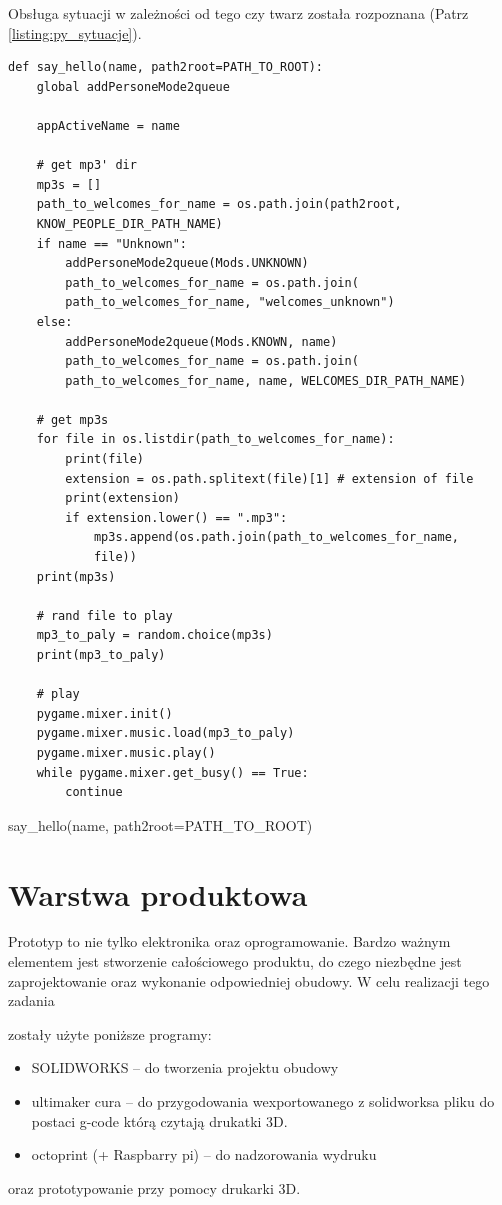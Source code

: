 \documentclass[a4paper,12pt,reqno]{article}
\begin{document}
\newpage
Obsługa sytuacji w zależności od tego czy twarz została rozpoznana  (Patrz \ref{listing:py_sytuacje}).
\begin{listing}[H]%
\begin{mdframed}[backgroundcolor=codebg]
\begin{verbatim}
def say_hello(name, path2root=PATH_TO_ROOT):
    global addPersoneMode2queue
    
    appActiveName = name
    
    # get mp3' dir
    mp3s = []
    path_to_welcomes_for_name = os.path.join(path2root, 
    KNOW_PEOPLE_DIR_PATH_NAME)
    if name == "Unknown":
        addPersoneMode2queue(Mods.UNKNOWN)
        path_to_welcomes_for_name = os.path.join(
        path_to_welcomes_for_name, "welcomes_unknown")
    else:
        addPersoneMode2queue(Mods.KNOWN, name)
        path_to_welcomes_for_name = os.path.join(
        path_to_welcomes_for_name, name, WELCOMES_DIR_PATH_NAME)
        
    # get mp3s
    for file in os.listdir(path_to_welcomes_for_name):
        print(file)
        extension = os.path.splitext(file)[1] # extension of file
        print(extension)
        if extension.lower() == ".mp3":
            mp3s.append(os.path.join(path_to_welcomes_for_name, 
            file))
    print(mp3s)        
        
    # rand file to play
    mp3_to_paly = random.choice(mp3s)
    print(mp3_to_paly)
    
    # play      
    pygame.mixer.init()
    pygame.mixer.music.load(mp3_to_paly)
    pygame.mixer.music.play()
    while pygame.mixer.get_busy() == True:
        continue
\end{verbatim}
\end{mdframed}
\caption{say\_hello(name, path2root=PATH\_TO\_ROOT)}
\label{listing:py_sytuacje}
\end{listing}

\newpage
\section{Warstwa produktowa} \label{section:warstwa_produkcyjna} %
Prototyp to nie tylko elektronika oraz oprogramowanie. Bardzo ważnym elementem jest stworzenie całościowego produktu, do czego niezbędne jest zaprojektowanie oraz wykonanie odpowiedniej obudowy. W celu realizacji tego zadania \textcolor{new}{zostały użyte poniższe programy:
\begin{itemize}
\item SOLIDWORKS – do tworzenia projektu obudowy
\item ultimaker cura – do przygodowania wexportowanego z solidworksa pliku do postaci g-code którą czytają drukatki 3D.
\item octoprint (+ Raspbarry pi) – do nadzorowania wydruku
\end{itemize}}
oraz prototypowanie przy pomocy drukarki 3D.
\end{document}
